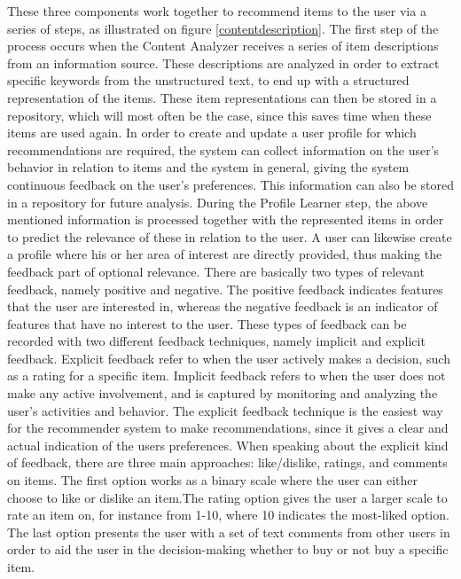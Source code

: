 These three components work together to recommend items to the user via a series of steps, as illustrated on figure \ref{contentdescription}.\newline 
The first step of the process occurs when the Content Analyzer receives a series of item descriptions from an information source. These descriptions are analyzed in order to extract specific keywords from the unstructured text, to end up with a structured representation of the items. These item representations can then be stored in a repository, which will most often be the case, since this saves time when these items are used again. In order to create and update a user profile for which recommendations are required, the system can collect information on the user's behavior in relation to items and the system in general, giving the system continuous feedback on the user's preferences. This information can also be stored in a repository for future analysis.\newline
During the Profile Learner step, the above mentioned information is processed together with the represented items in order to predict the relevance of these in relation to the user. A user can likewise create a profile where his or her area of interest are directly provided, thus making the feedback part of optional relevance.\newline
There are basically two types of relevant feedback, namely positive and negative. The positive feedback indicates features that the user are interested in, whereas the negative feedback is an indicator of features that have no interest to the user. \newline
These types of feedback can be recorded with two different feedback techniques, namely implicit and explicit feedback. Explicit feedback refer to when the user actively makes a decision, such as a rating for a specific item. Implicit feedback refers to when the user does not make any active involvement, and is captured by monitoring and analyzing the user's activities and behavior.\newline
The explicit feedback technique is the easiest way for the recommender system to make recommendations, since it gives a clear and actual indication of the users preferences. When speaking about the explicit kind of feedback, there are three main approaches: like/dislike, ratings, and comments on items.\newline
The first option works as a binary scale where the user can either choose to like or dislike an item.The rating option gives the user a larger scale to rate an item on, for instance from 1-10, where 10 indicates the most-liked option. The last option presents the user with a set of text comments from other users in order to aid the user in the decision-making whether to buy or not buy a specific item.\newline

